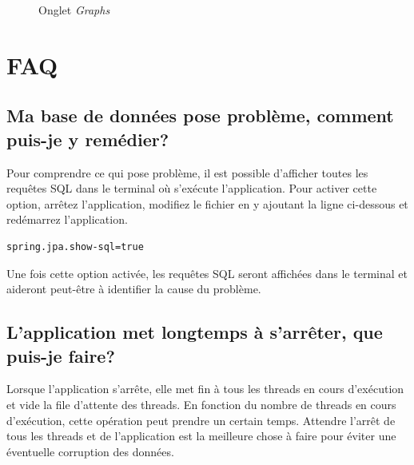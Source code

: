 \documentclass{article}
\begin{document}
\begin{figure}
\noindent{}
\caption{Onglet \emph{Graphs}}
\label{graphs-fig}
\end{figure}

\clearpage

\section{FAQ}

\subsection{Ma base de données pose problème, comment puis-je y remédier?}

Pour comprendre ce qui pose problème, il est possible d'afficher toutes les requêtes SQL dans le terminal où s'exécute l'application.  Pour activer cette option, arrêtez l'application, modifiez le fichier  en y ajoutant la ligne ci-dessous et redémarrez l'application.

\begin{verbatim}
spring.jpa.show-sql=true
\end{verbatim}

Une fois cette option activée, les requêtes SQL seront affichées dans le terminal et aideront peut-être à identifier la cause du problème.


\subsection{L'application met longtemps à s'arrêter, que puis-je faire?}

Lorsque l'application s'arrête, elle met fin à tous les threads en cours d'exécution et vide la file d'attente des threads.  En fonction du nombre de threads en cours d'exécution, cette opération peut prendre un certain temps.  Attendre l'arrêt de tous les threads et de l'application est la meilleure chose à faire pour éviter une éventuelle corruption des données.
\end{document}
